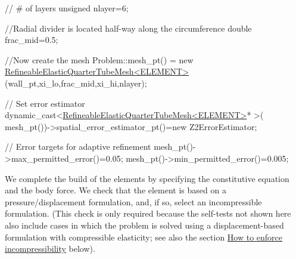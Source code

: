 \begin{DoxyCodeInclude}
 \textcolor{comment}{// # of layers}
 \textcolor{keywordtype}{unsigned} nlayer=6;

 \textcolor{comment}{//Radial divider is located half-way along the circumference}
 \textcolor{keywordtype}{double} frac\_mid=0.5;

 \textcolor{comment}{//Now create the mesh }
 Problem::mesh\_pt() = \textcolor{keyword}{new} \hyperlink{classRefineableElasticQuarterTubeMesh}{RefineableElasticQuarterTubeMesh<ELEMENT>}
  (wall\_pt,xi\_lo,frac\_mid,xi\_hi,nlayer);
 
 \textcolor{comment}{// Set error estimator}
 \textcolor{keyword}{dynamic\_cast<}\hyperlink{classRefineableElasticQuarterTubeMesh}{RefineableElasticQuarterTubeMesh<ELEMENT>}* \textcolor{keyword}{>}(
  mesh\_pt())->spatial\_error\_estimator\_pt()=\textcolor{keyword}{new} Z2ErrorEstimator;

 \textcolor{comment}{// Error targets for adaptive refinement}
 mesh\_pt()->max\_permitted\_error()=0.05;
 mesh\_pt()->min\_permitted\_error()=0.005;

\end{DoxyCodeInclude}


We complete the build of the elements by specifying the constitutive equation and the body force. We check that the element is based on a pressure/displacement formulation, and, if so, select an incompressible formulation. (This check is only required because the self-\/tests not shown here also include cases in which the problem is solved using a displacement-\/based formulation with compressible elasticity; see also the section \hyperlink{index_incompr}{How to enforce incompressibility} below).


